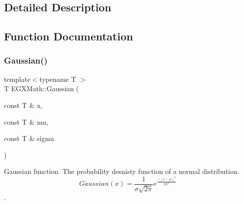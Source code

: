 \subsection{Detailed Description}


\subsection{Function Documentation}
\mbox{\label{group___g_x_math-_functions-_gaussian_ga647b46315081e299edc16a1c7f4e4032}} 
\subsubsection{\texorpdfstring{Gaussian()}{Gaussian()}}
{\footnotesize\ttfamily template$<$typename T $>$ \\
T E\+G\+X\+Math\+::\+Gaussian (\begin{DoxyParamCaption}\item[{const T \&}]{x,  }\item[{const T \&}]{mu,  }\item[{const T \&}]{sigma }\end{DoxyParamCaption})}



Gaussian function. The probability desnisty function of a normal distribution. \[Gaussian(x)=\frac{1}{\sigma \sqrt{2\pi}}e^{\frac{-(x-\mu)^2}{2\sigma^2}}\]. 

